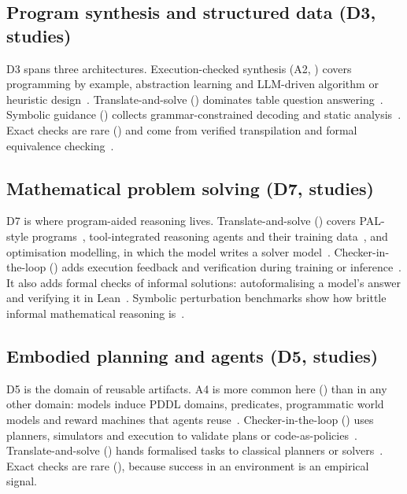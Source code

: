 \subsection{Program synthesis and structured data (D3,  studies)}
D3 spans three architectures. Execution-checked synthesis (A2, ) covers programming by example, abstraction learning and LLM-driven algorithm or heuristic design~\cite{wang2024hypothesis,li2025combining,stengeleskin2024regal,liu2024evolution,ye2024reevo}. Translate-and-solve () dominates table question answering~\cite{cheng2023binding,cao2023api,abhyankar2025h}. Symbolic guidance () collects grammar-constrained decoding and static analysis~\cite{scholak2021picard,wang2023grammar,wei2023typet5,barke2024hysynth}. Exact checks are rare () and come from verified transpilation and formal equivalence checking~\cite{bhatia2024verified,lee2024guess}.

\subsection{Mathematical problem solving (D7,  studies)}
D7 is where program-aided reasoning lives. Translate-and-solve () covers PAL-style programs~\cite{gao2023pal}, tool-integrated reasoning agents and their training data~\cite{gou2024tora,wang2024mathcoder,toshniwal2024openmathinstruct}, and optimisation modelling, in which the model writes a solver model~\cite{astorga2025autoformulation,yang2025optibench}. Checker-in-the-loop () adds execution feedback and verification during training or inference~\cite{zhou2024solving,xiong2025building,feng2026retool}. It also adds formal checks of informal solutions: autoformalising a model's answer and verifying it in Lean~\cite{zhou2024don,yao2025fans,ospanov2026hermes}. Symbolic perturbation benchmarks show how brittle informal mathematical reasoning is~\cite{mirzadeh2025gsm,opedal2025mathgap}.

\subsection{Embodied planning and agents (D5,  studies)}
D5 is the domain of reusable artifacts. A4 is more common here () than in any other domain: models induce PDDL domains, predicates, programmatic world models and reward machines that agents reuse~\cite{tang2024worldcoder,liang2026exopredicator,liang2025visualpredicator,ye2025unidomain,castanyer2026arm}. Checker-in-the-loop () uses planners, simulators and execution to validate plans or code-as-policies~\cite{silver2024generalized,mahdavi2024leveraging,ahn2025reliable}. Translate-and-solve () hands formalised tasks to classical planners or solvers~\cite{hao2025planning,huang2025planning}. Exact checks are rare (), because success in an environment is an empirical signal.

